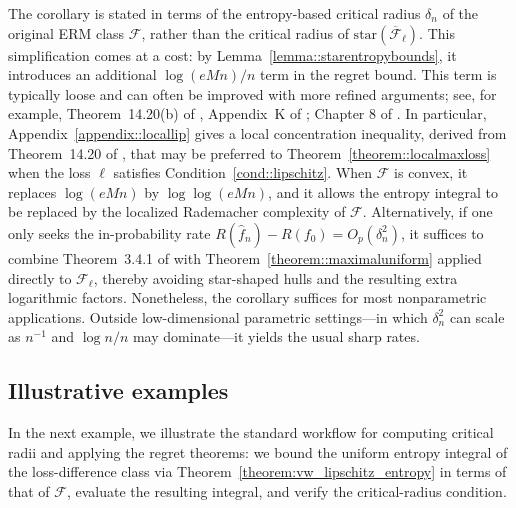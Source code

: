 \documentclass[11pt]{article}
\theoremstyle{plain}
\theoremstyle{definition} %
\begin{document}
The corollary is stated in terms of the entropy-based critical radius
\(\delta_n\) of the original ERM class \(\mathcal F\), rather than the
critical radius of \(\mathrm{star}(\overline{\mathcal F}_{\ell})\). This
simplification comes at a cost: by Lemma~\ref{lemma::starentropybounds}, it
introduces an additional \(\log(eMn)/n\) term in the regret bound. This term
is typically loose and can often be improved with more refined arguments; see,
for example, Theorem~14.20(b) of \cite{wainwright2019high},
Appendix~K of \cite{foster2023orthogonal}; Chapter 8 of \cite{sen2018gentle}. In particular, Appendix~\ref{appendix::locallip} gives a local concentration inequality,
derived from Theorem~14.20 of \cite{wainwright2019high}, that may be preferred to
Theorem~\ref{theorem::localmaxloss} when the loss \(\ell\) satisfies
Condition~\ref{cond::lipschitz}. When \(\mathcal F\) is convex, it replaces
\(\log(eMn)\) by \(\log\log(eMn)\), and it allows the entropy integral to be
replaced by the localized Rademacher complexity of \(\mathcal F\). Alternatively, if one only seeks the
in-probability rate \(R(\hat f_n)-R(f_0)=O_p(\delta_n^2)\), it suffices to
combine Theorem~3.4.1 of \cite{van1996weak} with
Theorem~\ref{theorem::maximaluniform} applied directly to
\(\mathcal{F}_{\ell}\), thereby avoiding star-shaped hulls and the resulting
extra logarithmic factors. Nonetheless, the corollary suffices for most
nonparametric applications. Outside low-dimensional parametric settings---in
which \(\delta_n^2\) can scale as \(n^{-1}\) and \(\log n / n\) may
dominate---it yields the usual sharp rates.

\subsection{Illustrative examples}

In the next example, we illustrate the standard workflow for computing critical radii and applying the regret theorems: we bound the uniform entropy integral of the loss-difference class via Theorem~\ref{theorem:vw_lipschitz_entropy} in terms of that of \(\mathcal F\), evaluate the resulting integral, and verify the critical-radius condition.
\end{document}

